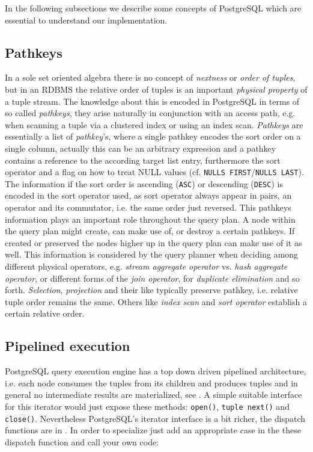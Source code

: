 In the following subsections we describe some concepts of PostgreSQL
which are essential to understand our implementation.

\subsection{Pathkeys}
\label{sec:pathkeys}
In a sole set oriented algebra there is no concept of \emph{nextness}
or \emph{order of tuples}, but in an RDBMS the relative order of
tuples is an important \emph{physical property} of a tuple stream.
The knowledge about this is encoded in PostgreSQL in terms of so
called \emph{pathkeys}, they arise naturally in conjunction with an
access path, e.g.  when scanning a tuple via a clustered index or
using an index scan.
\emph{Pathkeys} are essentially a list of \emph{pathkey}'s, where a single
pathkey encodes the sort order on a single column, actually this can
be an arbitrary expression and a pathkey contains a reference to the
according target list entry, furthermore the sort operator and a flag
on how to treat NULL values (cf. \texttt{NULLS FIRST}/\texttt{NULLS
LAST}). The information if the sort order is ascending (\texttt{ASC})
or descending (\texttt{DESC}) is encoded in the sort operator used, as
sort operator always appear in pairs, an operator and its commutator,
i.e. the same order just reversed.  This pathkeys information plays an
important role throughout the query plan.  A node within the query plan
might create, can make use of, or destroy a certain pathkeys.  If
created or preserved the nodes higher up in the query plan can make
use of it as well.  This information is considered by the query planner when
deciding among different physical operators, e.g. \emph{stream
aggregate operator} vs. \emph{hash aggregate operator}, or different
forms of the \emph{join operator}, for \emph{duplicate elimination}
and so forth. \emph{Selection}, \emph{projection} and their like
typically preserve pathkey, i.e. relative tuple order remains the
same. Others like \emph{index scan} and \emph{sort operator} establish
a certain relative order.


\subsection{Pipelined execution}
PostgreSQL query execution engine has a top down driven pipelined
architecture, i.e. each node consumes the tuples from its children and
produces tuples and in general no intermediate results are
materialized, see .  A simple
suitable interface for this iterator would just expose these methods:
\texttt{open()}, \texttt{tuple next()} and \texttt{close()}.  Nevertheless
PostgreSQL's iterator interface is a bit richer, the dispatch functions
are in . In order to specialize
just add an appropriate case in the these dispatch function and call
your own code:

